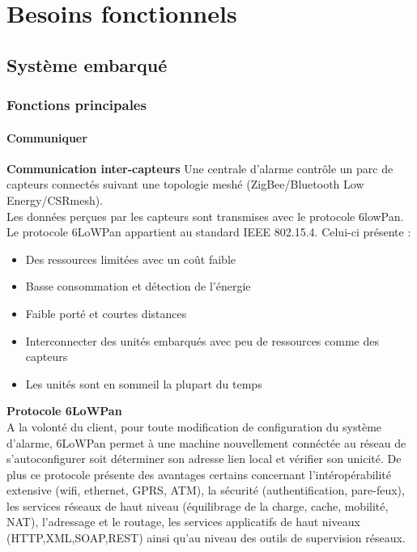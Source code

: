 \chapter{Besoins fonctionnels}

\section{Système embarqué}

\subsection{Fonctions principales}

\subsubsection{Communiquer}
\textbf{Communication inter-capteurs}
Une centrale d'alarme contrôle un parc de capteurs connectés suivant une topologie meshé (ZigBee/Bluetooth Low Energy/CSRmesh).\\
Les données perçues par les capteurs sont transmises avec le protocole 6lowPan.\\
Le protocole 6LoWPan appartient au standard IEEE 802.15.4. Celui-ci présente :\\
\begin{itemize}
\item Des ressources limitées avec un coût faible
\item Basse consommation et détection de l'énergie 
\item Faible porté et courtes distances
\item Interconnecter des unités embarqués avec peu de ressources comme des capteurs
\item Les unités sont en sommeil la plupart du temps\\
\end{itemize}

\textbf{Protocole 6LoWPan}\\
A la volonté du client, pour toute modification de configuration du système d'alarme, 6LoWPan permet à une machine nouvellement connéctée au réseau de s'autoconfigurer soit déterminer son adresse lien local et vérifier son unicité. De plus ce protocole présente des avantages certains concernant l'intéropérabilité extensive (wifi, ethernet, GPRS, ATM), la sécurité (authentification, pare-feux), les services réseaux de haut niveau (équilibrage de la charge, cache, mobilité, NAT), l'adressage et le routage, les services applicatifs de haut niveaux (HTTP,XML,SOAP,REST) ainsi qu'au niveau des outils de supervision réseaux.\cite{www:contiki}\\


